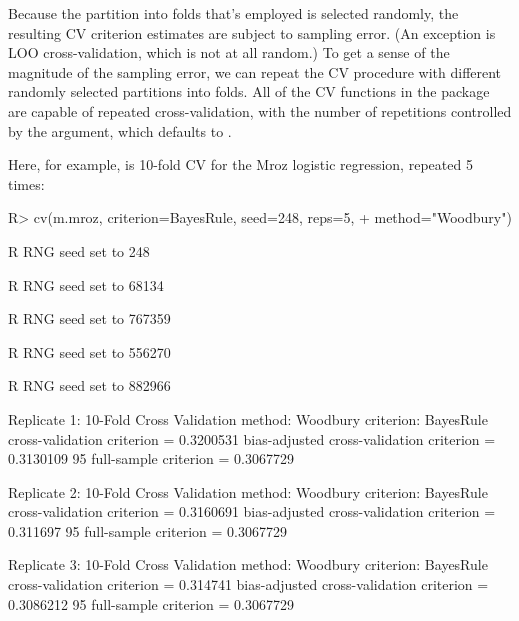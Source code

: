 \documentclass[
]{jss}
\begin{document}
Because the partition into folds that's employed is selected randomly,
the resulting CV criterion estimates are subject to sampling error. (An
exception is LOO cross-validation, which is not at all random.) To get a
sense of the magnitude of the sampling error, we can repeat the CV
procedure with different randomly selected partitions into folds. All of
the CV functions in the  package are capable of repeated
cross-validation, with the number of repetitions controlled by the
 argument, which defaults to .

Here, for example, is 10-fold CV for the Mroz logistic regression,
repeated 5 times:

\begin{CodeChunk}
\begin{CodeInput}
R> cv(m.mroz, criterion=BayesRule, seed=248, reps=5, 
+    method="Woodbury")
\end{CodeInput}
\begin{CodeOutput}
R RNG seed set to 248
\end{CodeOutput}
\begin{CodeOutput}
R RNG seed set to 68134
\end{CodeOutput}
\begin{CodeOutput}
R RNG seed set to 767359
\end{CodeOutput}
\begin{CodeOutput}
R RNG seed set to 556270
\end{CodeOutput}
\begin{CodeOutput}
R RNG seed set to 882966
\end{CodeOutput}
\begin{CodeOutput}

Replicate 1:
10-Fold Cross Validation
method: Woodbury
criterion: BayesRule
cross-validation criterion = 0.3200531
bias-adjusted cross-validation criterion = 0.3130109
95%
full-sample criterion = 0.3067729 

Replicate 2:
10-Fold Cross Validation
method: Woodbury
criterion: BayesRule
cross-validation criterion = 0.3160691
bias-adjusted cross-validation criterion = 0.311697
95%
full-sample criterion = 0.3067729 

Replicate 3:
10-Fold Cross Validation
method: Woodbury
criterion: BayesRule
cross-validation criterion = 0.314741
bias-adjusted cross-validation criterion = 0.3086212
95%
full-sample criterion = 0.3067729 


\end{CodeOutput}
\end{CodeChunk}
\end{document}
